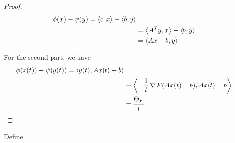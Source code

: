 \begin{proof}
  \begin{align}
    \label{eq:86}
    \phi(x) - \psi(y) = \IP{c, x} - \IP{b, y} \\
    &= \IP{A^{T} y, x} - \IP{b, y} \\
    &= \IP{Ax - b, y}
  \end{align}

  For the second part, we have
  \begin{align}
    \label{eq:87}
    \phi(x(t)) - \psi(y(t)) = \IP{y(t), Ax(t) - b} \\
    &= \IP{-\frac{1}{t} \grad F(Ax(t) - b), Ax(t) - b} \\
    &= \frac{\Theta_{F}}{t}
  \end{align}
\end{proof}

\begin{proposition}
  Define
  \begin{align}
    \label{eq:88}
  \end{align}
\end{proposition}



